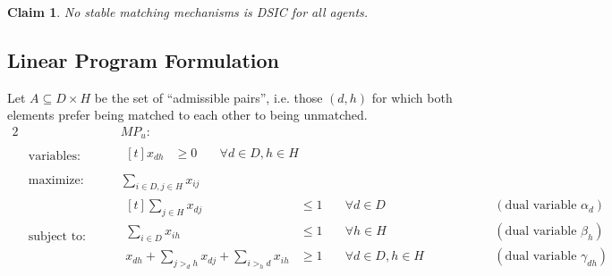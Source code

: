 \documentclass[12pt]{article}
\newtheorem{claim}[definition]{Claim}
\begin{document}
  \begin{claim}
    No stable matching mechanisms is DSIC for all agents.
  \end{claim}

\subsection{Linear Program Formulation}

  Let $A\subseteq D\times H$ be the set of ``admissible pairs'', i.e. 
  those $(d,h)$ for which both elements prefer being matched to each other to
  being unmatched.
  \begin{alignat*}{2}
    & & & MP_u: \\
    & \text{variables: } & &
      \begin{aligned}[t]
        x_{dh}
          & \ge 0
          & \quad \forall d\in D, h\in H \\
      \end{aligned} \\
    & \text{maximize: } & &
      \sum_{i\in D, j\in H} x_{ij} \\
    & \text{subject to: }& \quad &
      \begin{aligned}[t]
          \sum_{j\in H} x_{dj}
          & \le 1
          & \quad \forall d\in D
          &\qquad\qquad& (\text{dual variable $\alpha_d$}) \\
          \sum_{i\in D} x_{ih}
          & \le 1
          & \quad \forall h\in H
          &\qquad\qquad& (\text{dual variable $\beta_h$}) \\
          x_{dh} + \sum_{j>_d h} x_{dj} + \sum_{i>_h d} x_{ih}
          & \ge 1
          & \quad \forall d\in D, h\in H
          &\qquad\qquad& (\text{dual variable $\gamma_{dh}$}) \\
      \end{aligned}
  \end{alignat*}
\end{document}
